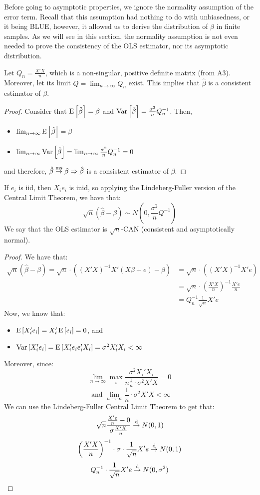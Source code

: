 Before going to asymptotic properties, we ignore the normality assumption of the error term. Recall that this assumption had nothing to do with unbiasedness, or it being BLUE, however, it allowed us to derive the distribution of $\beta$ in finite samples. As we will see in this section, the normality assumption is not even needed to prove the consistency of the OLS estimator, nor its asymptotic distribution.

\begin{proposition}
Let $Q_n = \frac{X'X}{n}$, which is a non-singular, positive definite matrix (from A3). Moreover, let its limit $Q = \lim_{n\to\infty} Q_n$ exist. This implies that $\hat\beta$ is a consistent estimator of $\beta$.
\end{proposition}
\begin{proof}
Consider that $\operatorname{E}\left[\hat{\beta}\right]=\beta$ and $\operatorname{Var}\left[\hat{\beta}\right] = \frac{\sigma^2}{n}Q_n^{-1}$. Then, \begin{itemize}
\item $\lim_{n\to\infty}\operatorname{E}\left[\hat{\beta}\right] = \beta$
\item $\lim_{n\to\infty}\operatorname{Var}\left[\hat{\beta}\right] = \lim_{n\to\infty} \frac{\sigma^2}{n}Q_n^{-1} = 0$
\end{itemize}
and therefore, $\hat{\beta}\overset{\text{ms}}{\to}\beta \Rightarrow \hat\beta$ is a consistent estimator of $\beta$.
\end{proof}

\begin{proposition}
If $e_i$ is iid, then $X_ie_i$ is inid, so applying the Lindeberg-Fuller version of the Central Limit Theorem, we have that: $$\sqrt{n}(\hat\beta - \beta) \sim N\left(0, \frac{\sigma^2}{n}Q^{-1}\right) $$
We say that the OLS estimator is $\sqrt{n}$-CAN (consistent and asymptotically normal).
\end{proposition}
\begin{proof}
We have that: \begin{align*}
\sqrt{n}(\hat\beta - \beta) = \sqrt{n}\cdot\left((X'X)^{-1}X'(X\beta + e) - \beta\right) & = \sqrt{n}\cdot\left((X'X)^{-1}X'e\right) \\
& = \sqrt{n}\cdot\left(\frac{X'X}{n}\right)^{-1}\frac{X'e}{n} \\
& = Q_n^{-1}\frac{1}{\sqrt{n}} X'e
\end{align*}
Now, we know that:\begin{itemize}
\item $\operatorname{E}\left[X_i'e_i\right] = X_i'\operatorname{E}\left[e_i\right] = 0$, and
\item $\operatorname{Var}\left[X_i'e_i\right] = \operatorname{E}\left[X_i'e_ie_i'X_i\right] = \sigma^2{X_i'X_i} < \infty$
\end{itemize}
Moreover, since: $$\lim_{n\to\infty} \max_{i} \frac{\sigma^2{X_i'X_i}}{n\frac{1}{n}\cdot \sigma^2{X'X}} = 0 $$ $$\text{ and } \lim_{n\to\infty} \frac{1}{n}\cdot \sigma^2{X'X} < \infty $$
We can use the Lindeberg-Fuller Central Limit Theorem to get that: $$\sqrt{n}\frac{\frac{X'e}{n} - 0}{\sigma\frac{X'X}{n}} \overset{\text{d}}{\to} N(0, 1) $$
$$\left(\frac{X'X}{n}\right)^{-1} \cdot \sigma \cdot \frac{1}{\sqrt{n}}X'e \overset{\text{d}}{\to} N(0, 1) $$
$$Q_n^{-1} \cdot \frac{1}{\sqrt{n}}X'e \overset{\text{d}}{\to} N(0, \sigma^2) $$
\end{proof}